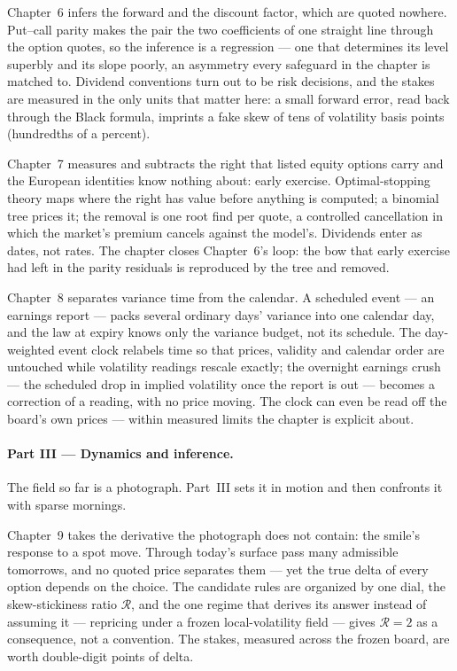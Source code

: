 Chapter~6 infers the forward and the discount factor, which are
quoted nowhere.  Put--call parity makes the pair the two
coefficients of one straight line through the option quotes, so the
inference is a regression --- one that determines its level superbly
and its slope poorly, an asymmetry every safeguard in the chapter is
matched to.  Dividend conventions turn out to be risk decisions, and
the stakes are measured in the only units that matter here: a small
forward error, read back through the Black formula, imprints a fake
skew of tens of volatility basis points (hundredths of a percent).

Chapter~7 measures and subtracts the right that listed equity
options carry and the European identities know nothing about: early
exercise.  Optimal-stopping theory maps where the right has value
before anything is computed; a binomial tree prices it; the removal
is one root find per quote, a controlled cancellation in which the
market's premium cancels against the model's.  Dividends enter as
dates, not rates.  The chapter closes Chapter~6's loop: the bow that
early exercise had left in the parity residuals is reproduced by the
tree and removed.

Chapter~8 separates variance time from the calendar.  A scheduled
event --- an earnings report --- packs several ordinary days'
variance into one calendar day, and the law at expiry knows only the
variance budget, not its schedule.  The day-weighted event clock
relabels time so that prices, validity and calendar order are
untouched while volatility readings rescale exactly; the overnight
earnings crush --- the scheduled drop in implied volatility once
the report is out --- becomes a correction of a
reading, with no price moving.  The clock can even be read off the
board's own prices --- within measured limits the chapter is
explicit about.

\paragraph{Part III --- Dynamics and inference.}
The field so far is a photograph.  Part~III sets it in motion and
then confronts it with sparse mornings.

Chapter~9 takes the derivative the photograph does not contain: the
smile's response to a spot move.  Through today's surface pass many
admissible tomorrows, and no quoted price separates them --- yet the
true delta of every option depends on the choice.  The candidate
rules are organized by one dial, the skew-stickiness ratio
$\mathcal{R}$, and the one regime that derives its answer instead of
assuming it --- repricing under a frozen local-volatility field ---
gives $\mathcal{R}=2$ as a consequence, not a convention.  The
stakes, measured across the frozen board, are worth double-digit
points of delta.

